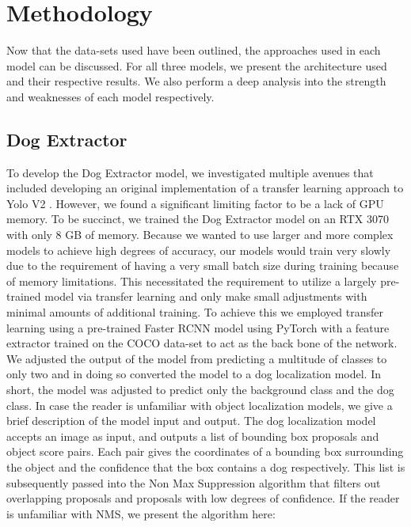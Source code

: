 \documentclass{article}
\begin{document}
\section{Methodology}
Now that the data-sets used have been outlined, the approaches used in each model can be discussed.  For all three models, we present the architecture used and their respective results.  We also perform a deep analysis into the strength and weaknesses of each model respectively.  

\subsection{Dog Extractor}

To develop the Dog Extractor model, we investigated multiple avenues that included developing an original implementation of a transfer learning approach to Yolo V2 \cite{RedmonJoseph2016YBFS}.  However, we found a significant limiting factor to be a lack of GPU memory.  To be succinct, we trained the Dog Extractor model on an RTX 3070 with only 8 GB of memory.  Because we wanted to use larger and more complex models to achieve high degrees of accuracy, our models would train very slowly due to the requirement of having a very small batch size during training because of memory limitations.  This necessitated the requirement to utilize a largely pre-trained model via transfer learning and only make small adjustments with minimal amounts of additional training.  To achieve this we employed transfer learning using a pre-trained Faster RCNN \cite{DBLP:journals/corr/RenHG015} model using PyTorch with a feature extractor trained on the COCO data-set \cite{coco} to act as the back bone of the network.  We adjusted the output of the model from predicting a multitude of classes to only two and in doing so converted the model to a dog localization model.  In short, the model was adjusted to predict only the background class and the dog class.  In case the reader is unfamiliar with object localization models, we give a brief description of the model input and output.  The dog localization model accepts an image as input, and outputs a list of bounding box proposals and object score pairs.  Each pair gives the coordinates of a bounding box surrounding the object and the confidence that the box contains a dog respectively.  This list is subsequently passed into the Non Max Suppression algorithm \cite{nms} that filters out overlapping proposals and proposals with low degrees of confidence.  If the reader is unfamiliar with NMS, we present the algorithm here: \\
\end{document}
